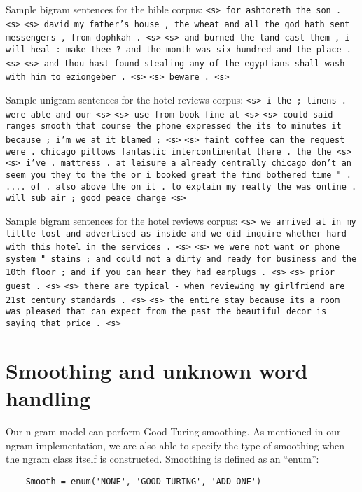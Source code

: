 \documentclass{article}
\begin{document}
Sample bigram sentences for the bible corpus:\npar
\texttt{<s> for ashtoreth the son . <s>}\npar
\texttt{<s> david my father's house , the wheat and all the god hath sent messengers , from dophkah . <s>}\npar
\texttt{<s> and burned the land cast them , i will heal : make thee ? and the month was six hundred and the place . <s>}\npar
\texttt{<s> and thou hast found stealing any of the egyptians shall wash with him to eziongeber . <s>}\npar
\texttt{<s> beware . <s>}\npar
\bigskip

Sample unigram sentences for the hotel reviews corpus:\npar
\texttt{<s> i the ; linens . were able and our <s>}\npar
\texttt{<s> use from book fine at <s>}\npar
\texttt{<s> could said ranges smooth that course the phone expressed the its to minutes it because ; i'm we at it blamed ; <s>}\npar
\texttt{<s> faint coffee can the request were . chicago pillows fantastic intercontinental there . the the <s>}\npar
\texttt{<s> i've . mattress . at leisure a already centrally chicago don't an seem you they to the the or i booked great the find bothered time " . .... of . also above the on it . to explain my really the was online . will sub air ; good peace charge <s>}\npar
\bigskip

Sample bigram sentences for the hotel reviews corpus:\npar
\texttt{<s> we arrived at in my little lost and advertised as inside and we did inquire whether hard with this hotel in the services . <s>}\npar
\texttt{<s> we were not want or phone system " stains ; and could not a dirty and ready for business and the 10th floor ; and if you can hear they had earplugs . <s>}\npar
\texttt{<s> prior guest . <s>}\npar
\texttt{<s> there are typical - when reviewing my girlfriend are 21st century standards . <s>}\npar
\texttt{<s> the entire stay because its a room was pleased that can expect from the past the beautiful decor is saying that price . <s>}\npar

\fi

\section{Smoothing and unknown word handling}

Our n-gram model can perform Good-Turing smoothing. As mentioned in our ngram implementation, we are also able to specify the type of smoothing when the ngram class itself is constructed. Smoothing is defined as an ``enum'':

{\small\begin{verbatim}
    Smooth = enum('NONE', 'GOOD_TURING', 'ADD_ONE')
\end{verbatim}}
\end{document}
